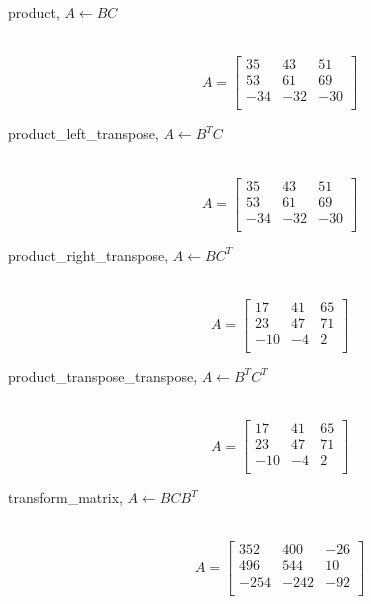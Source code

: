 \begin{description}
  \item[product, $A \leftarrow BC$]\ \newline
    \begin{equation}\nonumber
    A = \left[
    \begin{array}{rrr}
     35  &  43  &  51 \\
     53  &  61  &  69 \\
    -34  & -32  & -30 \\
    \end{array}\right]
    \end{equation}

  \item[product\_left\_transpose, $A \leftarrow B^TC$]\ \newline
    \begin{equation}\nonumber
    A = \left[
    \begin{array}{rrr}
     35  &  43  &  51 \\
     53  &  61  &  69 \\
    -34  & -32  & -30 \\
    \end{array}\right]
    \end{equation}

  \item[product\_right\_transpose, $A \leftarrow BC^T$]\ \newline
    \begin{equation}\nonumber
    A = \left[
    \begin{array}{rrr}
     17  &  41  &  65 \\
     23  &  47  &  71 \\
    -10  &  -4  &   2 \\
    \end{array}\right]
    \end{equation}

  \item[product\_transpose\_transpose, $A \leftarrow B^T C^T$]\ \newline
    \begin{equation}\nonumber
    A = \left[
    \begin{array}{rrr}
     17  &  41  &  65 \\
     23  &  47  &  71 \\
    -10  &  -4  &   2 \\
    \end{array}\right]
    \end{equation}

  \item[transform\_matrix, $A \leftarrow BCB^T$]\ \newline
    \begin{equation}\nonumber
    A = \left[
    \begin{array}{rrr}
     352  &  400  &  -26 \\
     496  &  544  &   10 \\
    -254  & -242  &  -92 \\
    \end{array}\right]
    \end{equation}


\end{description}
